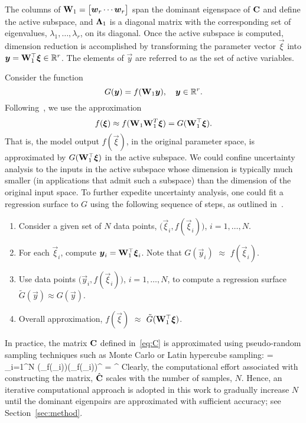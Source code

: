 \ee
The columns of $\mat{W}_1 = 
\begin{bmatrix} \vec{w}_r \cdots \vec{w}_r\end{bmatrix}$ 
span the dominant eigenspace of $\mathbf{{C}}$ and
define the active subspace, and $\mathbf{{\Lambda}}_1$ is a diagonal matrix with
the corresponding set of eigenvalues, $\lambda_1, \ldots, \lambda_r$, on its diagonal. 
Once the active subspace
is computed, dimension reduction is accomplished by transforming the parameter
vector $\vec\xi$ into 
$\vec{y} = \mat{W}_1^\top\vec{\xi} \in \R^r$. The elements of $\vec{y}$ are 
referred to as the set of active variables. 

Consider the function
\[
    G(\vec{y}) = f(\mat{W}_1\vec{y}), \quad \vec{y} \in \R^r.
\]
Following~\cite{Constantine:2015}, we use the approximation 
\[
f(\vec{\xi}) \approx f(\mat{W}_1 \mat{W}_1^T \vec\xi) =  
G(\mat{W}_1^\top \vec{\xi}).
\] 
That is, the model output $f(\vec\xi)$, in the original parameter space,
is approximated by $G(\mat{W}_1^\top \vec{\xi})$ in the active subspace.
We could confine uncertainty analysis to the inputs in the
active subspace whose dimension is typically much smaller (in applications that
admit such a subspace) than the dimension of the original input space. To further
expedite uncertainty analysis, one could fit a regression surface to $G$ using the 
following sequence of steps, as outlined in~\cite[chapter 4]{Constantine:2015}. 
\begin{enumerate}
\item Consider a given set of $N$ 
data points, $\big(\vec{\xi}_i, f(\vec{\xi}_i)\big)$, $i = 1, \ldots, N$. 
\item For each $\vec{\xi}_i$, compute $\vec{y}_i = \mat{W}_1^\top\vec{\xi}_i$. Note that
 $G(\vec{y}_i)$ $\approx$ $f(\vec{\xi}_i)$.
\item Use data points $\big(\vec{y}_i, f(\vec\xi_i)\big)$, $i = 1, \ldots, N$, to compute a 
regression surface $\tilde{G}(\vec{y})\approx 
G(\vec{y})$.
\item Overall approximation, $f(\vec{\xi})$ $\approx$ $\tilde{G}(\mat{W}_1^\top\vec{\xi})$.
\end{enumerate}

In practice, the matrix $\mathbf{{C}}$ defined in~\eqref{eq:C} is 
approximated using pseudo-random sampling techniques such as Monte Carlo or
Latin hypercube sampling:
 \be
 \approx {} = \sum\limits_{i=1}^{N} 
 (\nabla_{\vec{\xi}}f(\vec{\xi}_i))(\nabla_{\vec{\xi}}f(\vec{\xi}_i))^\top
 = \hat{\mat{\Lambda}}^\top
\label{eq:chat}
 \ee
Clearly, the computational effort associated with constructing the matrix,
$\hat{\mathbf{{C}}}$ scales with the number of samples, $N$. Hence, an iterative
computational approach is adopted in this work to gradually increase  
$N$ until the dominant eigenpairs are approximated
with sufficient accuracy; see Section~\ref{sec:method}. 

